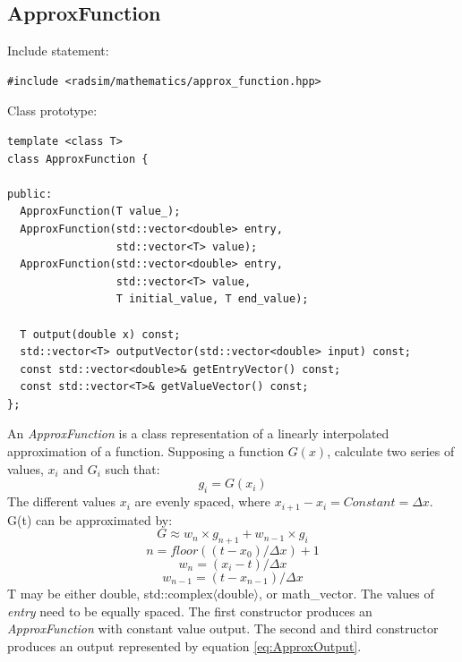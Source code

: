 \documentclass[letterpaper]{book}
\begin{document}
\subsection{ApproxFunction}
Include statement:
\begin{lstlisting}
#include <radsim/mathematics/approx_function.hpp>
\end{lstlisting}
Class prototype:
\begin{lstlisting}
template <class T>
class ApproxFunction {

public:
  ApproxFunction(T value_);
  ApproxFunction(std::vector<double> entry, 
                 std::vector<T> value);
  ApproxFunction(std::vector<double> entry, 
                 std::vector<T> value, 
                 T initial_value, T end_value);

  T output(double x) const;
  std::vector<T> outputVector(std::vector<double> input) const;
  const std::vector<double>& getEntryVector() const;
  const std::vector<T>& getValueVector() const;
};
\end{lstlisting}
An \textit{ApproxFunction} is a class representation of a linearly interpolated approximation of a function. Supposing a function \(G(x)\), calculate two series of values, \(x_{i}\) and \(G_{i}\) such that:
\begin{equation} \label{eq:ApproxFunction}
g_{i} = G(x_{i})
\end{equation}
The different values \(x_{i}\) are evenly spaced, where \(x_{i+1} - x_{i} = Constant = \Delta x\). G(t) can be approximated by:
\begin{equation} \label{eq:ApproxOutput}
G \approx w_{n} \times g_{n+1} + w_{n-1} \times g_{i}
\end{equation}
\begin{equation}
n = floor{((t - x_{0}) / {\Delta x})} + 1
\end{equation}
\begin{equation}
w_{n} = (x_{i} - t) / {\Delta x}
\end{equation}
\begin{equation}
w_{n-1} = (t - x_{n-1}) / {\Delta x}
\end{equation}
T may be either double, std::complex$\langle$double$\rangle$, or math\_vector. The values of \textit{entry} need to be equally spaced. The first constructor produces an \textit{ApproxFunction} with constant value output. The second and third constructor produces an output represented by equation \ref{eq:ApproxOutput}. 
\end{document}
